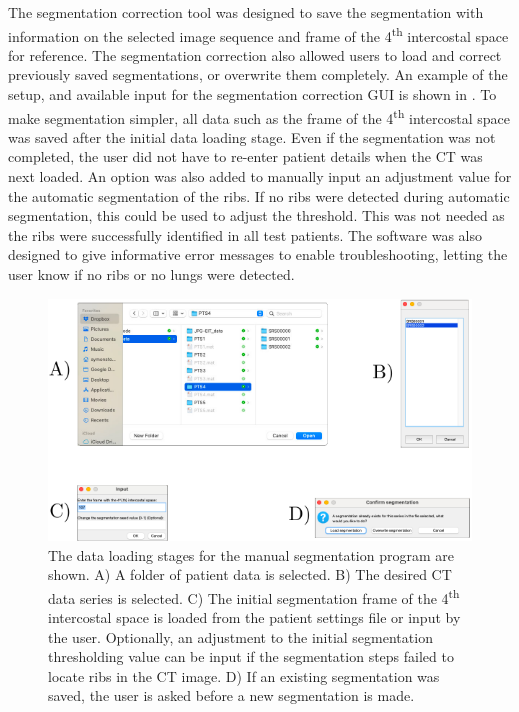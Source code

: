 The segmentation correction tool was designed to save the segmentation with information
on the selected image sequence and frame of the 4\textsuperscript{th} intercostal space 
for reference. 
The segmentation correction also allowed users to load and correct previously saved
segmentations, or overwrite them completely.
An example of the setup, and available input for the segmentation 
correction GUI is shown in .
To make segmentation simpler, all data such as the frame of the 4\textsuperscript{th}
intercostal space was saved after the initial data loading stage. Even if the segmentation 
was not completed, the user did not have to re-enter patient details when the CT was 
next loaded. 
An option was also added to manually input an adjustment value for the automatic
segmentation of the ribs. If no ribs were detected during automatic segmentation,
this could be used to adjust the threshold.
This was not needed as the ribs were successfully identified in all test patients.
The software was also designed to give informative error messages 
to enable troubleshooting, letting the user know if no ribs or no lungs 
were detected. 

\begin{figure}
	\centering
	\includegraphics[width=\textwidth]{chapter5-CT_to_mesh/imgs/SegmentationAppSetup.pdf}
	\caption[Manual segmentation data loading]{\label{fig:seg_load}%
	The data loading stages for the manual segmentation program are shown.
	A) A folder of patient data is selected. B) The desired CT data series is selected.
	C) The initial segmentation frame of the 4\textsuperscript{th} intercostal space 
	is loaded from the patient settings file or input by the user. Optionally, an 
	adjustment to the initial segmentation thresholding value can be input if the 
	segmentation steps failed to locate ribs in the CT image. D) If an existing
	segmentation was saved, the user is asked before a new segmentation 
	is made.
	}
\end{figure}


